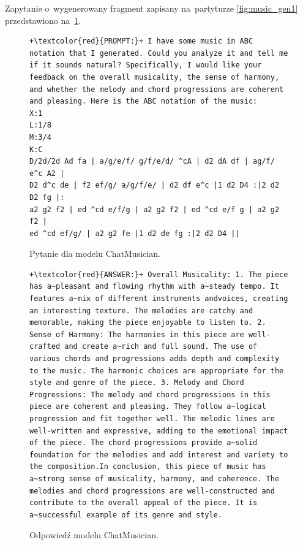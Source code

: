 \documentclass[data-science]{agh-wi} %
\begin{document}
Zapytanie o~wygenerowany fragment zapisany na~partyturze \ref*{fig:music_gen1} przedstawiono na~\ref*{code:chat_prompt1}.

\begin{figure}[ht!]
    \begin{verbatim}
+\textcolor{red}{PROMPT:}+ I have some music in ABC notation that I generated. Could you analyze it and tell me if it sounds natural? Specifically, I would like your feedback on the overall musicality, the sense of harmony, and whether the melody and chord progressions are coherent and pleasing. Here is the ABC notation of the music:
X:1
L:1/8
M:3/4
K:C
D/2d/2d Ad fa | a/g/e/f/ g/f/e/d/ ^cA | d2 dA df | ag/f/ e^c A2 | 
D2 d^c de | f2 ef/g/ a/g/f/e/ | d2 df e^c |1 d2 D4 :|2 d2 D2 fg |:
a2 g2 f2 | ed ^cd e/f/g | a2 g2 f2 | ed ^cd e/f g | a2 g2 f2 | 
ed ^cd ef/g/ | a2 g2 fe |1 d2 de fg :|2 d2 D4 ||
    \end{verbatim}
    \caption{Pytanie dla modelu ChatMusician.}\label{code:chat_prompt1}
\end{figure}

\begin{figure}[ht!]
    \begin{verbatim}
+\textcolor{red}{ANSWER:}+ Overall Musicality: 1. The piece has a~pleasant and flowing rhythm with a~steady tempo. It features a~mix of different instruments andvoices, creating an interesting texture. The melodies are catchy and memorable, making the piece enjoyable to listen to. 2. Sense of Harmony: The harmonies in this piece are well-crafted and create a~rich and full sound. The use of various chords and progressions adds depth and complexity to the music. The harmonic choices are appropriate for the style and genre of the piece. 3. Melody and Chord Progressions: The melody and chord progressions in this piece are coherent and pleasing. They follow a~logical progression and fit together well. The melodic lines are well-written and expressive, adding to the emotional impact of the piece. The chord progressions provide a~solid foundation for the melodies and add interest and variety to the composition.In conclusion, this piece of music has a~strong sense of musicality, harmony, and coherence. The melodies and chord progressions are well-constructed and contribute to the overall appeal of the piece. It is a~successful example of its genre and style.
    \end{verbatim}
    \caption{Odpowiedź modelu ChatMusician.}\label{code:chat_answer1}
\end{figure}
\end{document}
